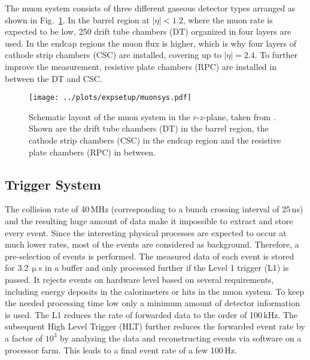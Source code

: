 \noindent The muon system consists of three different gaseous detector types arranged as shown in Fig.~\ref{fig:expsetup:muonsys}. In the barrel region at $|\eta|<1.2$, where the muon rate is expected to be low, 250 drift tube chambers (DT) organized in four layers are used. In the endcap regions the muon flux is higher, which is why four layers of  cathode strip chambers (CSC) are installed, covering up to $|\eta|=2.4$. To further improve the measurement, resistive plate chambers (RPC) are installed in between the DT and CSC.
\begin{figure}
    \centering
    \texttt{[image: ../plots/expsetup/muonsys.pdf]}
    \caption[Schematic layout of the muon system in the $r$-$z$-plane]{Schematic layout of the muon system in the $r$-$z$-plane, taken from \cite{CMS_design}. Shown are the drift tube chambers (DT) in the barrel region, the cathode strip chambers (CSC) in the endcap region and the resistive plate chambers (RPC) in between.}
    \label{fig:expsetup:muonsys}
\end{figure}
\subsection*{Trigger System}
The collision rate of 40\,MHz (corresponding to a bunch crossing interval of 25\,ns) and the resulting huge amount of data make it impossible to extract and store every event. Since the interesting physical processes are expected to occur at much lower rates, most of the events are considered as background. Therefore, a pre-selection of events is performed. The measured data of each event is stored for 3.2\,$\upmu$s in a buffer and only processed further if the Level 1 trigger (L1) \cite{triggerL1} is passed. It rejects events on hardware level based on several requirements, including energy deposits in the calorimeters or hits in the muon system. To keep the needed processing time low only a minimum amount of detector information is used. The L1 reduces the rate of forwarded data to the order of 100\,kHz. The subsequent High Level Trigger (HLT) \cite{HLT} further reduces the forwarded event rate by a factor of $10^3$ by analysing the data and reconstructing events via software on a processor farm. This leads to a final event rate of a few 100\,Hz.
